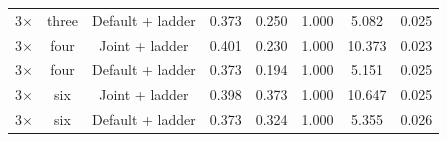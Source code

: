 \begin{table}
\begin{tabular}{lccccccc}
3$\times$ & three & Default + ladder & 0.373 & 0.250 & 1.000 & 5.082 & 0.025 \\
3$\times$ & four & Joint + ladder & 0.401 & 0.230 & 1.000 & 10.373 & 0.023 \\
3$\times$ & four & Default + ladder & 0.373 & 0.194 & 1.000 & 5.151 & 0.025 \\
3$\times$ & six & Joint + ladder & 0.398 & 0.373 & 1.000 & 10.647 & 0.025 \\
3$\times$ & six & Default + ladder & 0.373 & 0.324 & 1.000 & 5.355 & 0.026 \\
\bottomrule
\end{tabular}
\par\vspace{2pt}{\footnotesize\raggedright Every ladder keeps the full-effort rung and the 0.1 floor. ``two'' is a single fallback rung above the floor.\par}
\end{table}
